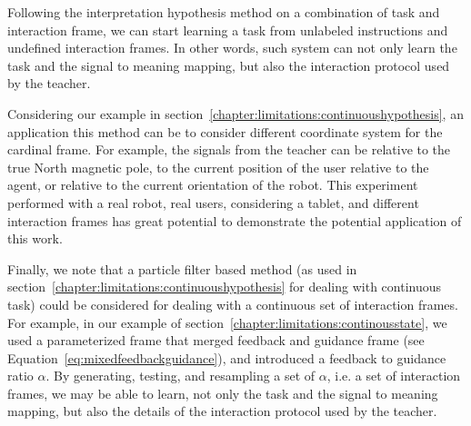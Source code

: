 Following the interpretation hypothesis method on a combination of task and interaction frame, we can start learning a task from unlabeled instructions and undefined interaction frames. In other words, such system can not only learn the task and the signal to meaning mapping, but also the interaction protocol used by the teacher.

Considering our example in section~\ref{chapter:limitations:continuoushypothesis}, an application this method can be to consider different coordinate system for the cardinal frame. For example, the signals from the teacher can be relative to the true North magnetic pole, to the current position of the user relative to the agent, or relative to the current orientation of the robot. This experiment performed with a real robot, real users, considering a tablet, and different interaction frames has great potential to demonstrate the potential application of this work.

Finally, we note that a particle filter based method (as used in section~\ref{chapter:limitations:continuoushypothesis} for dealing with continuous task) could be considered for dealing with a continuous set of interaction frames. For example, in our example of section~\ref{chapter:limitations:continousstate}, we used a parameterized frame that merged feedback and guidance frame (see Equation~\ref{eq:mixedfeedbackguidance}), and introduced a feedback to guidance ratio $\alpha$. By generating, testing, and resampling a set of $\alpha$, i.e. a set of interaction frames, we may be able to learn, not only the task and the signal to meaning mapping, but also the details of the interaction protocol used by the teacher.


